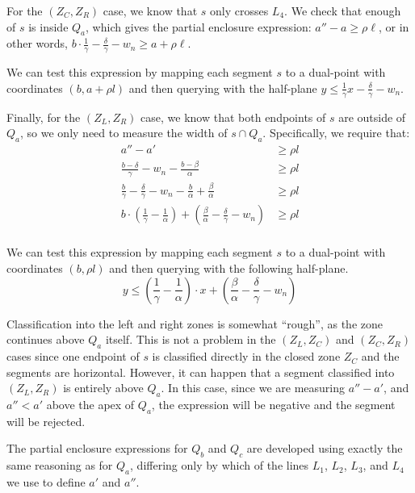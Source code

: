 For the $(Z_C, Z_R)$ case, we know that $s$ only crosses $L_4$. 
We check that enough of $s$ is inside $Q_a$, which gives the  partial enclosure expression: $a'' - a \geq \rho \ell$, or in other words, $b \cdot \frac{1}{\gamma} - \frac{\delta}{\gamma} - w_n \geq a + \rho \ell$.

\noindent We can test this expression by mapping each segment $s$ to a dual-point with coordinates $(b, a + \rho l)$ and then querying with the half-plane $y \leq \frac{1}{\gamma} x - \frac{\delta}{\gamma} - w_n$.

Finally, for the $(Z_L, Z_R)$ case, we know that both endpoints of $s$ are outside of $Q_a$, so we only need to measure the width of $s \cap Q_a$.  
Specifically, we require that:
\[
\begin{split} 
a'' - a' &\geq \rho l \\
%
\frac{b - \delta}{\gamma} - w_n - \frac{b - \beta}{\alpha} &\geq \rho l \\
%
\frac{b}{\gamma} - \frac{\delta}{\gamma} - w_n - \frac{b}{\alpha} + \frac{\beta}{\alpha} &\geq \rho l \\
%
b \cdot \left ( \frac{1}{\gamma} - \frac{1}{\alpha} \right ) + \left ( \frac{\beta}{\alpha} - \frac{\delta}{\gamma} - w_n \right ) &\geq \rho l \\
%
\end{split}
\]

\noindent We can test this expression by mapping each segment $s$ to a dual-point with coordinates $(b, \rho l)$ and then querying with the following half-plane.
\[
y \leq \left ( \frac{1}{\gamma} - \frac{1}{\alpha} \right ) \cdot x + \left ( \frac{\beta}{\alpha} - \frac{\delta}{\gamma} - w_n \right )
\]

\noindent Classification into the left and right zones is somewhat ``rough'', as the zone continues above $Q_a$ itself. 
This is not a problem in the $(Z_L, Z_C)$ and $(Z_C, Z_R)$ cases since one endpoint of $s$ is classified directly in the closed zone $Z_C$ and the segments are horizontal.
However, it can happen that a segment classified into $(Z_L, Z_R)$ is entirely above $Q_a$. 
In this case, since we are measuring $a'' - a'$, and $a'' < a'$ above the apex of $Q_a$, the expression will be negative and the segment will be rejected.

The partial enclosure expressions for $Q_b$ and $Q_c$ are developed using exactly the same reasoning as for $Q_a$, differing only by which of the lines $L_1$, $L_2$, $L_3$, and $L_4$ we use to define $a'$ and $a''$.


